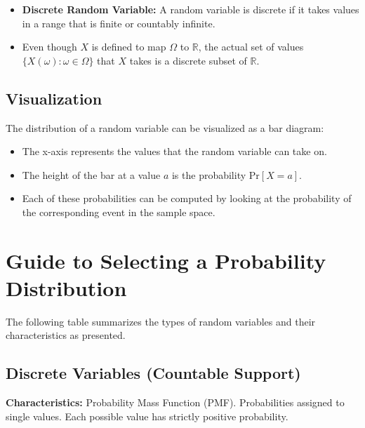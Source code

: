 \documentclass[11pt, a4paper]{article}
\begin{document}
\begin{itemize}
    \item \textbf{Discrete Random Variable:} A random variable is discrete if it takes values in a range that is finite or countably infinite.
    \item Even though $X$ is defined to map $\Omega$ to $\mathbb{R}$, the actual set of values $\{X(\omega) : \omega \in \Omega\}$ that $X$ takes is a discrete subset of $\mathbb{R}$.
\end{itemize}

\subsection{Visualization}
The distribution of a random variable can be visualized as a bar diagram:
\begin{itemize}
    \item The x-axis represents the values that the random variable can take on.
    \item The height of the bar at a value $a$ is the probability $\text{Pr}[X=a]$.
    \item Each of these probabilities can be computed by looking at the probability of the corresponding event in the sample space.
\end{itemize}

\section{Guide to Selecting a Probability Distribution}

The following table summarizes the types of random variables and their characteristics as presented.

\subsection{Discrete Variables (Countable Support)}
\textbf{Characteristics:} Probability Mass Function (PMF). Probabilities assigned to single values. Each possible value has strictly positive probability.
\end{document}
